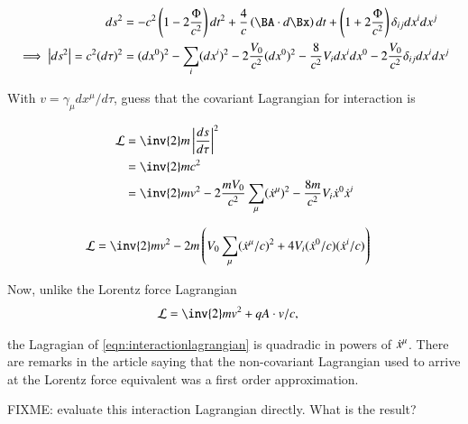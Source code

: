 \documentclass{article}
\begin{document}
\begin{align*}
ds^2 &= 
-c^2\left(1 - 2 \frac{\Phi}{c^2}\right) dt^2
+\frac{4}{c}\left(\BA \cdot d\Bx \right) dt 
+\left(1 + 2 \frac{\Phi}{c^2}\right) \delta_{ij}dx^i dx^j \\
\implies
\Abs{ds^2} = c^2 (d\tau)^2 &= (dx^0)^2 - \sum_i (dx^i)^2
-2 \frac{V_0}{c^2} (dx^0)^2
-\frac{8}{c^2} V_i dx^i dx^0
- 2 \frac{V_0}{c^2} \delta_{ij}dx^i dx^j
\end{align*}

With $v = \gamma_\mu dx^\mu/d\tau$, guess that the covariant Lagrangian for interaction is

\begin{align*}
\LL 
&= \inv{2} m \Abs{\frac{ds}{d\tau}}^2  \\
&= \inv{2} m c^2 \\
&= \inv{2} m v^2 -2 \frac{m V_0}{c^2} \sum_\mu (\xdot^\mu)^2 -\frac{8 m}{c^2} V_i \xdot^0 \xdot^i  \\
\end{align*}

\begin{align}\label{eqn:interactionlagrangian}
\LL &= \inv{2} m v^2 - 2m \left( V_0 \sum_\mu (\xdot^\mu / c)^2 + 4 V_i (\xdot^0/c) (\xdot^i/c) \right)
\end{align}

Now, unlike the Lorentz force Lagrangian
\begin{align*}
\LL &= \inv{2} m v^2 + q A \cdot v/c,
\end{align*}

the Lagragian of \ref{eqn:interactionlagrangian} is quadradic in powers of $\dot{x}^\mu$.  
There are remarks in the article saying that the non-covariant Lagrangian used to arrive at the Lorentz force equivalent was a first order approximation.

FIXME: evaluate this interaction Lagrangian directly.  What is the result?



\end{document}
